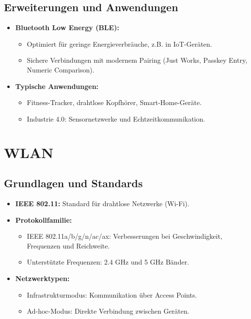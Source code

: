 \documentclass{article}
\begin{document}
\subsection{Erweiterungen und Anwendungen}
\begin{itemize}
    \item \textbf{Bluetooth Low Energy (BLE):}
    \begin{itemize}
        \item Optimiert für geringe Energieverbräuche, z.B. in IoT-Geräten.
        \item Sichere Verbindungen mit modernem Pairing (Just Works, Passkey Entry, Numeric Comparison).
    \end{itemize}
    \item \textbf{Typische Anwendungen:}
    \begin{itemize}
        \item Fitness-Tracker, drahtlose Kopfhörer, Smart-Home-Geräte.
        \item Industrie 4.0: Sensornetzwerke und Echtzeitkommunikation.
    \end{itemize}
\end{itemize}


\section{WLAN}

\subsection{Grundlagen und Standards}
\begin{itemize}
    \item \textbf{IEEE 802.11:} Standard für drahtlose Netzwerke (Wi-Fi).
    \item \textbf{Protokollfamilie:}
    \begin{itemize}
        \item IEEE 802.11a/b/g/n/ac/ax: Verbesserungen bei Geschwindigkeit, Frequenzen und Reichweite.
        \item Unterstützte Frequenzen: 2.4 GHz und 5 GHz Bänder.
    \end{itemize}
    \item \textbf{Netzwerktypen:}
    \begin{itemize}
        \item Infrastrukturmodus: Kommunikation über Access Points.
        \item Ad-hoc-Modus: Direkte Verbindung zwischen Geräten.
    \end{itemize}
\end{itemize}
\end{document}
